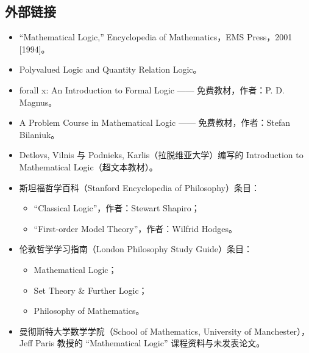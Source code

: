 \subsection{外部链接}
\begin{itemize}
  \item “Mathematical Logic,” Encyclopedia of Mathematics，EMS Press，2001 [1994]。
  \item Polyvalued Logic and Quantity Relation Logic。
  \item forall x: An Introduction to Formal Logic —— 免费教材，作者：P. D. Magnus。
  \item A Problem Course in Mathematical Logic —— 免费教材，作者：Stefan Bilaniuk。
  \item Detlovs, Vilnis 与 Podnieks, Karlis（拉脱维亚大学）编写的 Introduction to Mathematical Logic（超文本教材）。
  \item 斯坦福哲学百科（Stanford Encyclopedia of Philosophy）条目：
    \begin{itemize}
      \item “Classical Logic”，作者：Stewart Shapiro；
      \item “First-order Model Theory”，作者：Wilfrid Hodges。
    \end{itemize}
  \item 伦敦哲学学习指南（London Philosophy Study Guide）条目：
    \begin{itemize}
      \item Mathematical Logic；
      \item Set Theory \& Further Logic；
      \item Philosophy of Mathematics。
    \end{itemize}
  \item 曼彻斯特大学数学学院（School of Mathematics, University of Manchester），  
        Jeff Paris 教授的 “Mathematical Logic” 课程资料与未发表论文。
\end{itemize}

